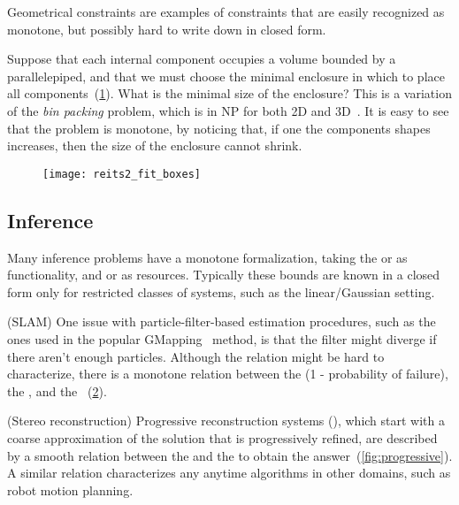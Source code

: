 Geometrical constraints are examples of constraints that are easily recognized as monotone, but possibly hard to write down in closed form.

\begin{example}
    Suppose that each internal component occupies a volume
    bounded by a parallelepiped, and that we must choose the minimal enclosure
    in which to place all components~(\cref{fig:packing}). What
    is the minimal size of the enclosure? This is a variation of the \emph{bin
    packing} problem, which is in NP for both 2D and 3D~\cite{lodi02two}.
    It is easy to see that the problem is monotone, by noticing that,
    if one the components shapes increases, then the size of the enclosure
    cannot shrink.
\end{example}

\begin{figure}[h]
    \centering
    \texttt{[image: reits2\_fit\_boxes]}
    \caption{\label{fig:packing}}
\end{figure}

\subsection{Inference}

Many inference problems have a monotone formalization, taking the
 or  as functionality, and 
or  as resources. Typically these bounds are known in
a closed form only for restricted classes of systems, such as the
linear/Gaussian setting.

\begin{example}
(SLAM)
    One issue with particle-filter-based estimation procedures,
    such as the ones used in the popular GMapping~\cite{grisetti07improved}
    method, is that the filter might diverge if there aren't enough particles.
    Although the relation might be hard to characterize, there is a monotone
    relation between the  (1 - probability of failure),
    the , and the ~(\cref{fig:gmapping}).
\end{example}

\begin{figure}[h]
    \centering
    \caption{\label{fig:gmapping} }
\end{figure}



\begin{example}
(Stereo reconstruction)
    Progressive reconstruction systems (\cite{locher16progressive}),
    which start with a coarse approximation of the solution that is progressively
    refined, are described by a smooth relation between the 
    and the  to obtain the answer~(\cref{fig:progressive}).
    A similar relation characterizes any anytime algorithms in other domains,
    such as robot motion planning.
\end{example}


